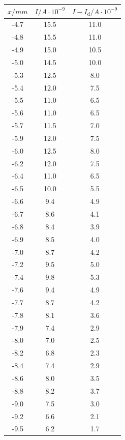 \begin{table}
\centering
\begin{minipage}{0.46\textwidth}
    \centering
	\begin{tabular}{c|c|c}
		\toprule
		{$x / mm$} & {$I / A\cdot10^{-9}$} & {$I - I_\text{d} / A\cdot10^{-9}$} \\
		\hline
        \midrule
        -4.7 &15.5&11.0\\
        -4.8 &15.5&11.0\\
        -4.9 &15.0&10.5\\
        -5.0 &14.5&10.0\\
        -5.3 &12.5&8.0\\
        -5.4 &12.0&7.5\\
        -5.5 &11.0&6.5\\
        -5.6 &11.0&6.5\\
        -5.7 &11.5&7.0\\
        -5.9 &12.0&7.5\\
        -6.0 &12.5&8.0\\
        -6.2 &12.0&7.5\\
        -6.4 &11.0&6.5\\
        -6.5 &10.0&5.5\\
        -6.6 &9.4&4.9\\
        -6.7 &8.6&4.1\\
        -6.8 &8.4&3.9\\
        -6.9 &8.5&4.0\\
        -7.0 &8.7&4.2\\
        -7.2 &9.5&5.0\\
        -7.4 &9.8&5.3\\
        -7.6 &9.4&4.9\\
        -7.7 &8.7&4.2\\
        -7.8 &8.1&3.6\\
        -7.9 &7.4&2.9\\
        -8.0 &7.0&2.5\\
        -8.2 &6.8&2.3\\
        -8.4 &7.4&2.9\\
        -8.6 &8.0&3.5\\
        -8.8 &8.2&3.7\\
        -9.0 &7.5&3.0\\
        -9.2 &6.6&2.1\\
        -9.5 &6.2&1.7\\
		\bottomrule 
	\end{tabular}
\end{minipage}

\end{table}
